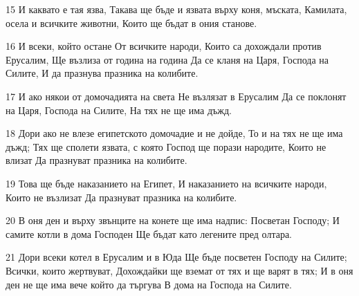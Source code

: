 \par 15 И каквато е тая язва, Такава ще бъде и язвата върху коня, мъската, Камилата, осела и всичките животни, Които ще бъдат в ония станове.
\par 16 И всеки, който остане От всичките народи, Които са дохождали против Ерусалим, Ще възлиза от година на година Да се кланя на Царя, Господа на Силите, И да празнува празника на колибите.
\par 17 И ако някои от домочадията на света Не възлязат в Ерусалим Да се поклонят на Царя, Господа на Силите, На тях не ще има дъжд.
\par 18 Дори ако не влезе египетското домочадие и не дойде, То и на тях не ще има дъжд; Тях ще сполети язвата, с която Господ ще порази народите, Които не влизат Да празнуват празника на колибите.
\par 19 Това ще бъде наказанието на Египет, И наказанието на всичките народи, Които не възлизат Да празнуват празника на колибите.
\par 20 В оня ден и върху звънците на конете ще има надпис: Посветан Господу; И самите котли в дома Господен Ще бъдат като легените пред олтара.
\par 21 Дори всеки котел в Ерусалим и в Юда Ще бъде посветен Господу на Силите; Всички, които жертвуват, Дохождайки ще вземат от тях и ще варят в тях; И в оня ден не ще има вече който да търгува В дома на Господа на Силите.

